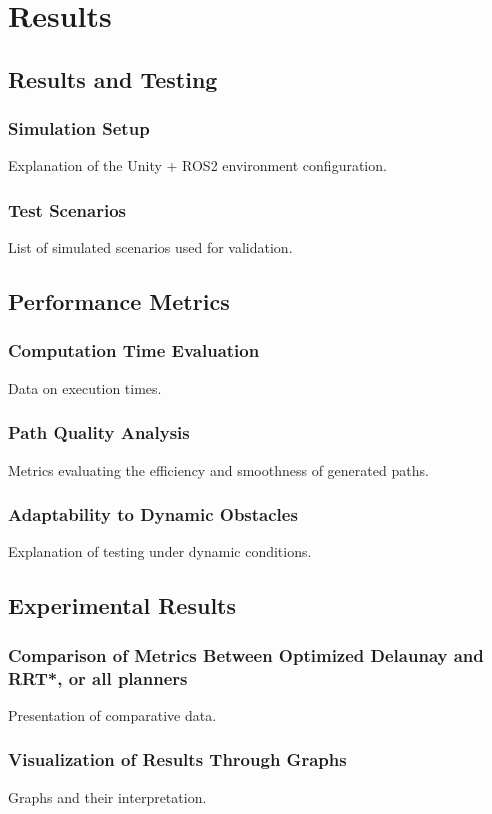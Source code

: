 \documentclass[a4paper,11pt]{report}
\begin{document}
\newpage

\chapter{Results}
\section{Results and Testing}
\subsection{Simulation Setup}
Explanation of the Unity + ROS2 environment configuration.

\subsection{Test Scenarios}
List of simulated scenarios used for validation.

\section{Performance Metrics}
\subsection{Computation Time Evaluation}
Data on execution times.

\subsection{Path Quality Analysis}
Metrics evaluating the efficiency and smoothness of generated paths.

\subsection{Adaptability to Dynamic Obstacles}
Explanation of testing under dynamic conditions.

\section{Experimental Results}
\subsection{Comparison of Metrics Between Optimized Delaunay and RRT*, or all planners}
Presentation of comparative data.

\subsection{Visualization of Results Through Graphs}
Graphs and their interpretation.
\end{document}
